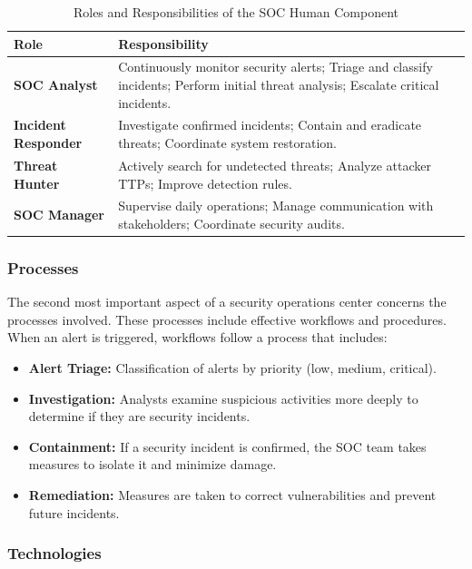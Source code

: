 \begin{table}[H]
\centering
\caption{Roles and Responsibilities of the SOC Human Component}
\label{tab:soc-roles}
\renewcommand{\arraystretch}{1.4}
\begin{tabular}{>{\raggedright\arraybackslash}p{3cm} p{10.5cm}}
\toprule
\rowcolor{tableheader}
\textbf{Role} & \textbf{Responsibility} \\
\midrule
\textbf{SOC Analyst} & Continuously monitor security alerts; Triage and classify incidents; Perform initial threat analysis; Escalate critical incidents. \\
\midrule
\textbf{Incident Responder} & Investigate confirmed incidents; Contain and eradicate threats; Coordinate system restoration. \\
\midrule
\textbf{Threat Hunter} & Actively search for undetected threats; Analyze attacker TTPs; Improve detection rules. \\
\midrule
\textbf{SOC Manager} & Supervise daily operations; Manage communication with stakeholders; Coordinate security audits. \\
\bottomrule
\end{tabular}
\end{table}

\subsubsection{Processes}

The second most important aspect of a security operations center concerns the processes involved. These processes include effective workflows and procedures. When an alert is triggered, workflows follow a process that includes:

\begin{itemize}
    \item \textbf{Alert Triage:} Classification of alerts by priority (low, medium, critical).
    \item \textbf{Investigation:} Analysts examine suspicious activities more deeply to determine if they are security incidents.
    \item \textbf{Containment:} If a security incident is confirmed, the SOC team takes measures to isolate it and minimize damage.
    \item \textbf{Remediation:} Measures are taken to correct vulnerabilities and prevent future incidents.
\end{itemize}

\subsubsection{Technologies}

